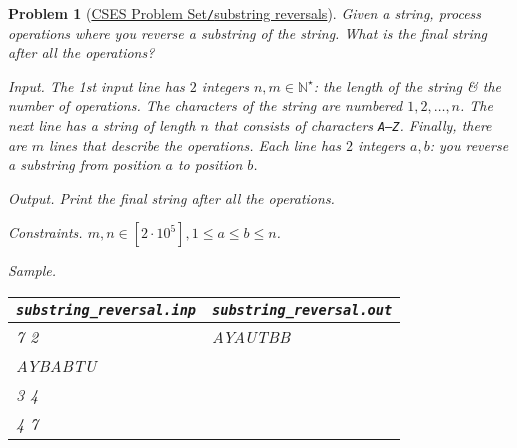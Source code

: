 \documentclass{article}
\newtheorem{problem}{Problem}
\begin{document}
\begin{problem}[\href{https://cses.fi/problemset/task/2073}{CSES Problem Set{\tt/}substring reversals}]
    Given a string, process operations where you reverse a substring of the string. What is the final string after all the operations?
    \item {\sf Input.} The 1st input line has $2$ integers $n,m\in\mathbb{N}^\star$: the length of the string \& the number of operations. The characters of the string are numbered $1,2,\ldots,n$. The next line has a string of length $n$ that consists of characters {\tt A--Z}. Finally, there are $m$ lines that describe the operations. Each line has $2$ integers $a,b$: you reverse a substring from position $a$ to position $b$.
    \item {\sf Output.} Print the final string after all the operations.
    \item {\sf Constraints.} $m,n\in[2\cdot10^5],1\le a\le b\le n$.
    \item {\sf Sample.}
    \begin{table}[H]
        \centering
        \begin{tabular}{|l|l|}
            \hline
            \verb|substring_reversal.inp| & \verb|substring_reversal.out| \\
            \hline
            7 2 & AYAUTBB \\
            AYBABTU & \\
            3 4 & \\
            4 7 & \\
            \hline
        \end{tabular}
    \end{table}
\end{problem}
\end{document}
